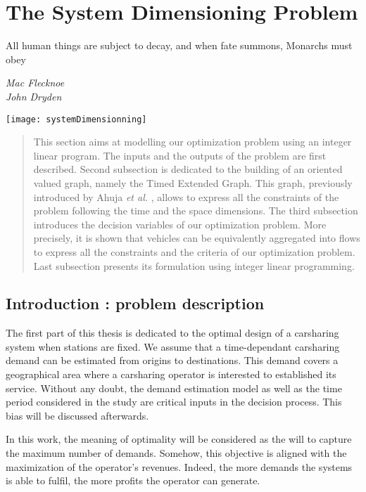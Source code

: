 \chapter{The System Dimensioning Problem} \label{chap:sdp}
\epigraph{All human things are subject to decay, and when fate summons, Monarchs must obey}{\textit{Mac Flecknoe \\ John Dryden}}

\begin{bibunit}[ieeetr]
\minitoc
\vspace{2cm}

\begin{minipage}[c]{0.3\linewidth}
\texttt{[image: systemDimensionning]}
\end{minipage}
\hfill
\begin{minipage}[c]{0.7\linewidth}
\begin{abstract}
This section aims at modelling our optimization problem using an integer linear program.
The inputs and the outputs of the problem are first described.
Second subsection is dedicated to the building of an oriented valued graph, namely the Timed Extended Graph. This graph, previously introduced by  Ahuja {\em et al.} \cite{ahujaNetwork1993}, allows to express all the constraints of the problem following the time and the space dimensions.
The third subsection introduces the decision variables of our optimization problem. More precisely, it is shown that vehicles can be equivalently aggregated into flows to express all the constraints and the criteria of our optimization problem.
Last subsection presents its formulation using integer linear programming.
\end{abstract}
\end{minipage}

\newpage
\section{Introduction : problem description}
The first part of this thesis is dedicated to the optimal design of a carsharing system when stations are fixed.
We assume that a time-dependant carsharing demand can be estimated from origins to destinations.
This demand covers a geographical area where a carsharing operator is interested to established its service.
Without any doubt, the demand estimation model as well as the time period considered in the study are critical inputs in the decision process.
This bias will be discussed afterwards.

In this work, the meaning of optimality will be considered as the will to capture the maximum number of demands.
Somehow, this objective is aligned with the maximization of the operator's revenues.
Indeed, the more demands the systems is able to fulfil, the more profits the operator can generate.


\end{bibunit}

